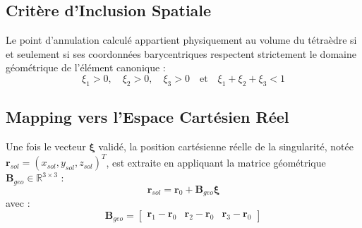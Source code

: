 \documentclass[11pt,a4paper]{article}
\begin{document}
\subsection{Critère d'Inclusion Spatiale}
Le point d'annulation calculé appartient physiquement au volume du tétraèdre si et seulement si ses coordonnées barycentriques respectent strictement le domaine géométrique de l'élément canonique :
\begin{equation}
\xi_1 > 0, \quad \xi_2 > 0, \quad \xi_3 > 0 \quad \text{et} \quad \xi_1 + \xi_2 + \xi_3 < 1
\end{equation}

\subsection{Mapping vers l'Espace Cartésien Réel}
Une fois le vecteur $\boldsymbol{\xi}$ validé, la position cartésienne réelle de la singularité, notée $\mathbf{r}_{sol} = (x_{sol}, y_{sol}, z_{sol})^T$, est extraite en appliquant la matrice géométrique $\mathbf{B}_{geo} \in \mathbb{R}^{3 \times 3}$ :
\begin{equation}
\mathbf{r}_{sol} = \mathbf{r}_0 + \mathbf{B}_{geo} \boldsymbol{\xi}
\end{equation}
avec :
\begin{equation}
\mathbf{B}_{geo} = \begin{bmatrix} \mathbf{r}_1 - \mathbf{r}_0 & \mathbf{r}_2 - \mathbf{r}_0 & \mathbf{r}_3 - \mathbf{r}_0 \end{bmatrix}
\end{equation}
\end{document}
